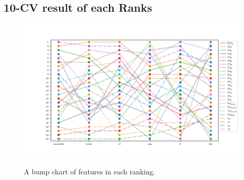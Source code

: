 \documentclass[pdflatex,sn-mathphys]{sn-jnl}%
\theoremstyle{thmstyleone}%
\theoremstyle{thmstyletwo}%
\theoremstyle{thmstylethree}%
\begin{document}
\begin{appendices}






\section{10-CV result of each Ranks}\label{apen:ranks}

\begin{figure}[h!]
  \centering
  \caption{A bump chart of features in each ranking.}
  \includegraphics[width=1\textwidth]{figures/bump_chart.png}
  \label{fig:bump_chart}
\end{figure}





\end{appendices}
\end{document}
